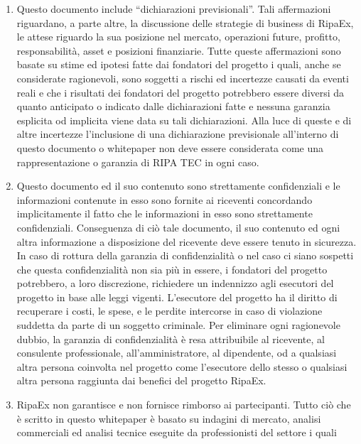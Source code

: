 \documentclass[11pt,fleqn]{book} %
\begin{document}
\begin{scriptsize}
{\begin{enumerate}
			fondatori dello stesso. Nessuna affermazione viene fatta o garantita in riguardo l'accuratezza o la completezza
			delle informazioni, stime o report in questo documento o in documenti scritti da terze parti e correlati dallo stesso.
			\item Questo documento include ``dichiarazioni previsionali''. Tali affermazioni riguardano, a parte altre, la discussione
			delle strategie di business di RipaEx, le attese riguardo la sua posizione nel mercato, operazioni future, profitto,
			responsabilità, asset e posizioni finanziarie. Tutte queste affermazioni sono basate su stime ed ipotesi fatte dai 
			fondatori del progetto i quali, anche se considerate ragionevoli, sono soggetti a rischi ed incertezze causati da eventi
			reali e che i risultati dei fondatori del progetto potrebbero essere diversi da quanto anticipato o indicato dalle 
			dichiarazioni fatte e nessuna garanzia esplicita od implicita viene data su tali dichiarazioni. Alla luce di queste e 
			di altre incertezze l'inclusione di una dichiarazione previsionale all'interno di questo documento o whitepaper non
			deve essere considerata come una rappresentazione o garanzia di RIPA TEC in ogni caso.
			\item Questo documento ed il suo contenuto sono strettamente confidenziali e le informazioni contenute in esso sono
			fornite ai riceventi concordando implicitamente il fatto che le informazioni in esso sono strettamente confidenziali.
			Conseguenza di ciò tale documento, il suo contenuto ed ogni altra informazione a disposizione del ricevente deve essere
			tenuto in sicurezza. In caso di rottura della garanzia di confidenzialità o nel caso ci siano sospetti che questa 
			confidenzialità non sia più in essere, i fondatori del progetto potrebbero, a loro discrezione, richiedere un indennizzo
			agli esecutori del progetto in base alle leggi vigenti. L'esecutore del progetto ha il diritto di recuperare i costi,
			le spese, e le perdite intercorse in caso di violazione suddetta da parte di un soggetto criminale. Per eliminare
			ogni ragionevole dubbio, la garanzia di confidenzialità è resa attribuibile al ricevente, al consulente professionale,
			all'amministratore, al dipendente, od a qualsiasi altra persona coinvolta nel progetto come l'esecutore dello stesso
			o qualsiasi altra persona raggiunta dai benefici del progetto RipaEx.
			\item RipaEx non garantisce e non fornisce rimborso ai partecipanti. Tutto ciò che è scritto in questo whitepaper
			è basato su indagini di mercato, analisi commerciali ed analisi tecnice eseguite da professionisti del settore i quali

\end{enumerate}}
\end{scriptsize}
\end{document}
